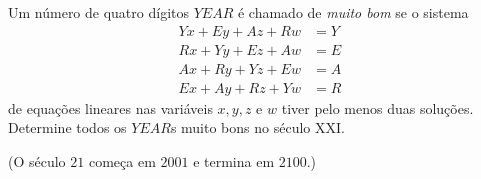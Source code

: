 Um número de quatro dígitos \(YEAR\) é chamado de \textit{muito bom} se o sistema
\begin{align*}
Yx+Ey+Az+Rw& =Y\\
Rx+Yy+Ez+Aw & = E\\
Ax+Ry+Yz+Ew & = A\\
Ex+Ay+Rz+Yw &= R
\end{align*}
de equações lineares nas variáveis \(x,y,z\) e \(w\) tiver pelo menos duas soluções. Determine todos os \(YEAR\)s muito bons no século XXI.

(O século \(21\) começa em \(2001\) e termina em \(2100\).)
